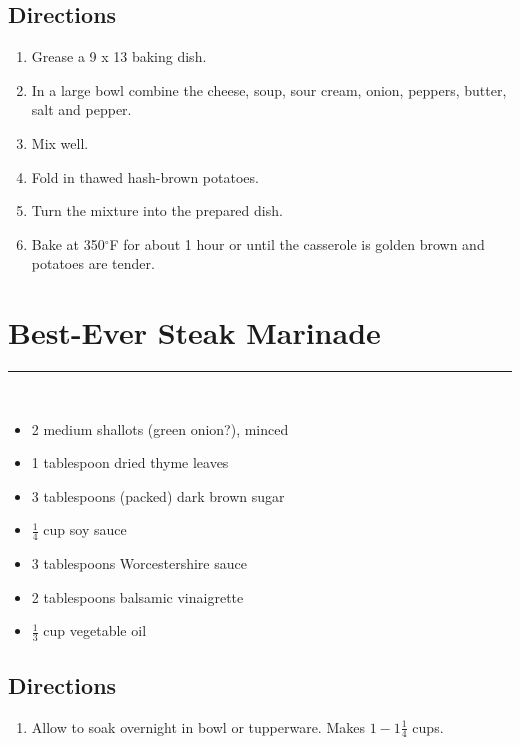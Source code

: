 \documentclass[12pt]{article}
\def \hzline{\noindent \rule[0mm]{\textwidth}{1pt}}
\begin{document}
\subsection*{Directions}
\begin{enumerate}
  \item Grease a 9 x 13 baking dish.  
  \item In a large bowl combine the cheese, soup, sour cream, onion, peppers, butter, salt and pepper. 
  \item Mix well. 
  \item Fold in thawed hash-brown potatoes.  
  \item Turn the mixture into the prepared dish.  
  \item Bake at 350$^\circ$F for about 1 hour or until the casserole is golden brown and potatoes are tender.
\end{enumerate}



\section*{Best-Ever Steak Marinade} \hzline \\
\begin{itemize}
  \item 2 medium shallots (green onion?), minced
  \item 1 tablespoon dried thyme leaves
  \item 3 tablespoons (packed) dark brown sugar
  \item $\frac{1}{4}$ cup soy sauce
  \item 3 tablespoons Worcestershire sauce
  \item 2 tablespoons balsamic vinaigrette
  \item $\frac{1}{3}$ cup vegetable oil
\end{itemize}

\subsection*{Directions}
\begin{enumerate}
  \item Allow to soak overnight in bowl or tupperware. Makes $1-1\frac{1}{4}$ cups.
\end{enumerate}




\end{document}
